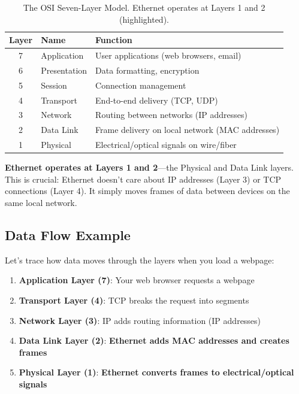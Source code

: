 \documentclass[openany]{tufte-book}
\begin{document}
\begin{fullwidth}
\begin{table}
\centering
\begin{tabular}{clp{8cm}}
\toprule
\textbf{Layer} & \textbf{Name} & \textbf{Function} \\
\midrule
7 & Application & User applications (web browsers, email) \\
6 & Presentation & Data formatting, encryption \\
5 & Session & Connection management \\
4 & Transport & End-to-end delivery (TCP, UDP) \\
3 & Network & Routing between networks (IP addresses) \\
\rowcolor{yellow!30}
2 & Data Link & Frame delivery on local network (MAC addresses) \\
\rowcolor{yellow!30}
1 & Physical & Electrical/optical signals on wire/fiber \\
\bottomrule
\end{tabular}
\caption{The OSI Seven-Layer Model. Ethernet operates at Layers 1 and 2 (highlighted).}
\end{table}
\end{fullwidth}

\textbf{Ethernet operates at Layers 1 and 2}---the Physical and Data Link layers. This is crucial: Ethernet doesn't care about IP addresses (Layer 3) or TCP connections (Layer 4). It simply moves frames of data between devices on the same local network.

\subsection{Data Flow Example}

Let's trace how data moves through the layers when you load a webpage:

\begin{enumerate}
\item \textbf{Application Layer (7)}: Your web browser requests a webpage
\item \textbf{Transport Layer (4)}: TCP breaks the request into segments
\item \textbf{Network Layer (3)}: IP adds routing information (IP addresses)
\item \textbf{Data Link Layer (2)}: \textbf{Ethernet adds MAC addresses and creates frames}
\item \textbf{Physical Layer (1)}: \textbf{Ethernet converts frames to electrical/optical signals}
\end{enumerate}
\end{document}
